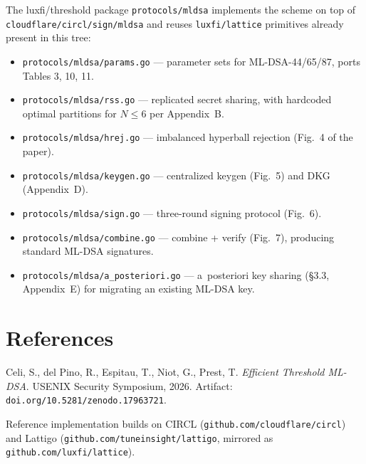 \documentclass[11pt]{article}
\begin{document}
The luxfi/threshold package \texttt{protocols/mldsa} implements the scheme
on top of \texttt{cloudflare/circl/sign/mldsa} and reuses
\texttt{luxfi/lattice} primitives already present in this tree:

\begin{itemize}
  \item \texttt{protocols/mldsa/params.go} — parameter sets for
        ML-DSA-44/65/87, ports Tables 3, 10, 11.
  \item \texttt{protocols/mldsa/rss.go} — replicated secret sharing,
        with hardcoded optimal partitions for $N \leq 6$ per Appendix~B.
  \item \texttt{protocols/mldsa/hrej.go} — imbalanced hyperball rejection
        (Fig.~4 of the paper).
  \item \texttt{protocols/mldsa/keygen.go} — centralized keygen (Fig.~5)
        and DKG (Appendix~D).
  \item \texttt{protocols/mldsa/sign.go} — three-round signing protocol
        (Fig.~6).
  \item \texttt{protocols/mldsa/combine.go} — combine + verify (Fig.~7),
        producing standard ML-DSA signatures.
  \item \texttt{protocols/mldsa/a\_posteriori.go} — a~posteriori key
        sharing (\S3.3, Appendix~E) for migrating an existing ML-DSA key.
\end{itemize}

\section{References}

Celi, S., del Pino, R., Espitau, T., Niot, G., Prest, T.
\emph{Efficient Threshold ML-DSA}. USENIX Security Symposium, 2026.
Artifact: \texttt{doi.org/10.5281/zenodo.17963721}.

Reference implementation builds on CIRCL
(\texttt{github.com/cloudflare/circl}) and Lattigo
(\texttt{github.com/tuneinsight/lattigo}, mirrored as \texttt{github.com/luxfi/lattice}).
\end{document}
